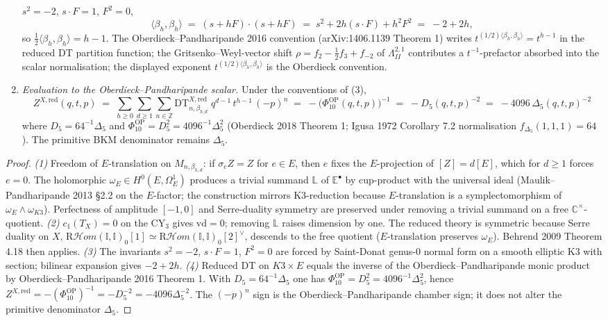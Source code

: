 \begin{proposition}
\begin{enumerate}
$s^2=-2$, $s\cdot F=1$, $F^2=0$,
\[
 \langle\beta_h,\beta_h\rangle
 \;=\; (s+hF)\cdot(s+hF)
 \;=\; s^2 + 2h(s\cdot F) + h^2 F^2
 \;=\; -2+2h,
\]
so $\tfrac12\langle\beta_h,\beta_h\rangle=h-1$. The
Oberdieck--Pandharipande 2016 convention (arXiv:1406.1139 Theorem 1)
writes $t^{(1/2)\langle\beta_h,\beta_h\rangle}=t^{h-1}$ in the reduced
DT partition function; the Gritsenko--Weyl-vector shift
$\rho=f_2-\tfrac12 f_3+f_{-2}$ of $\Lambda^{2,1}_{II}$ contributes a
	$t^{-1}$-prefactor absorbed into the scalar normalisation; the
	displayed exponent $t^{(1/2)\langle\beta_h,\beta_h\rangle}$ is the
	Oberdieck convention.
\item \emph{Evaluation to the Oberdieck--Pandharipande scalar.} Under the conventions of
\textup{(3)},
\[
 Z^{X,\mathrm{red}}(q,t,p)
 \;=\; \sum_{h\ge 0}\sum_{d\ge 1}\sum_{n\in\mathbb Z}
	 \mathrm{DT}^{X,\mathrm{red}}_{n,\beta_{h,d}}\;
	 q^{d-1}\, t^{h-1}\, (-p)^n
	 \;=\; -\bigl(\Phi_{10}^{\mathrm{OP}}(q,t,p)\bigr)^{-1}
	 \;=\; -D_5(q,t,p)^{-2}
	 \;=\; -4096\,\Delta_5(q,t,p)^{-2}
\]
where $D_5=64^{-1}\Delta_5$ and
$\Phi_{10}^{\mathrm{OP}}=D_5^2=4096^{-1}\Delta_5^2$
(Oberdieck 2018 Theorem 1; Igusa 1972 Corollary 7.2 normalisation
$f_{\Delta_5}(1,1,1)=64$). The primitive BKM denominator remains
$\Delta_5$.
\end{enumerate}
\end{proposition}

\begin{proof}
\emph{(1)} Freedom of $E$-translation on $M_{n,\beta_{h,d}}$: if
$\sigma_e Z=Z$ for $e\in E$, then $e$ fixes the $E$-projection of
$[Z]=d[E]$, which for $d\ge 1$ forces $e=0$. The holomorphic
$\omega_E\in H^0(E,\Omega^1_E)$ produces a trivial summand $\mathbb L$
of $\mathbb E^\bullet$ by cup-product with the universal ideal
(Maulik--Pandharipande 2013 \S 2.2 on the $E$-factor; the construction
mirrors K3-reduction because $E$-translation is a symplectomorphism of
$\omega_E\wedge\omega_{K3}$). Perfectness of amplitude $[-1,0]$ and
Serre-duality symmetry are preserved under removing a trivial summand
on a free $\mathbb C^\times$-quotient.
\emph{(2)} $c_1(T_X)=0$ on the CY$_3$ gives $\mathrm{vd}=0$; removing
$\mathbb L$ raises dimension by one. The reduced theory is symmetric
because Serre duality on $X$,
$\mathrm R\mathcal H\!om(\mathbb I,\mathbb I)_0[1]
\simeq\mathrm R\mathcal H\!om(\mathbb I,\mathbb I)_0[2]^\vee$,
descends to the free quotient ($E$-translation preserves
$\omega_E$). Behrend 2009 Theorem 4.18 then applies.
\emph{(3)} The invariants $s^2=-2$, $s\cdot F=1$, $F^2=0$ are forced
by Saint-Donat genus-$0$ normal form on a smooth elliptic K3 with
section; bilinear expansion gives $-2+2h$.
\emph{(4)} Reduced DT on $K3\times E$ equals the inverse of the
Oberdieck--Pandharipande
monic product by Oberdieck--Pandharipande 2016 Theorem 1. With
$D_5=64^{-1}\Delta_5$ one has
	$\Phi_{10}^{\mathrm{OP}}=D_5^2=4096^{-1}\Delta_5^2$, hence
	$Z^{X,\mathrm{red}}=-(\Phi_{10}^{\mathrm{OP}})^{-1}
	=-D_5^{-2}=-4096\Delta_5^{-2}$. The $(-p)^n$ sign is the Oberdieck--Pandharipande chamber sign; it
does not alter the primitive denominator $\Delta_5$.
\end{proof}

